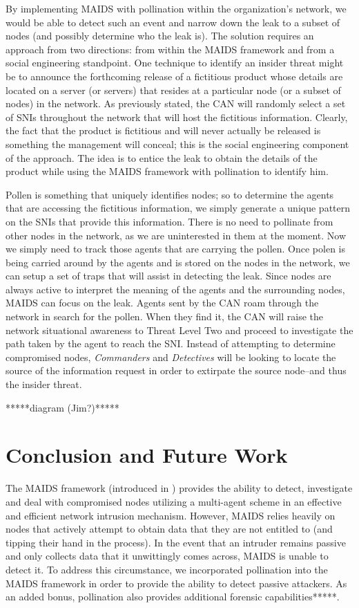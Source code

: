 \documentclass{acm_proc_article-sp}
\begin{document}
By implementing MAIDS with pollination within the organization's network, we would be able to detect such an event and narrow down the leak to a subset of nodes (and possibly determine who the leak is).  The solution requires an approach from two directions: from within the MAIDS framework and from a social engineering standpoint.  One technique to identify an insider threat might be to announce the forthcoming release of a fictitious product whose details are located on a server (or servers) that resides at a particular node (or a subset of nodes) in the network.  As previously stated, the CAN will randomly select a set of SNIs throughout the network that will host the fictitious information.  Clearly, the fact that the product is fictitious and will never actually be released is something the management will conceal; this is the social engineering component of the approach.  The idea is to entice the leak to obtain the details of the product while using the MAIDS framework with pollination to identify him.

Pollen is something that uniquely identifies nodes; so to determine the agents that are accessing the fictitious information, we simply generate a unique pattern on the SNIs that provide this information.  There is no need to pollinate from other nodes in the network, as we are uninterested in them at the moment.  Now we simply need to track those agents that are carrying the pollen.  Once polen is being carried around by the agents and is stored on the nodes in the network, we can setup a set of traps that will assist in detecting the leak.  Since nodes are always active to interpret the meaning of the agents and the surrounding nodes, MAIDS can focus on the leak.  Agents sent by the CAN roam through the network in search for the pollen.  When they find it, the CAN will raise the network situational awareness to Threat Level Two and proceed to investigate the path taken by the agent to reach the SNI.  Instead of attempting to determine compromised nodes, {\it Commanders} and {\it Detectives} will be looking to locate the source of the information request in order to extirpate the source node--and thus the insider threat.

*****diagram (Jim?)*****

\section{Conclusion and Future Work}
The MAIDS framework (introduced in \cite{kackley09}) provides the ability to detect, investigate and deal with compromised nodes utilizing a multi-agent scheme in an effective and efficient network intrusion mechanism.  However, MAIDS relies heavily on nodes that actively attempt to obtain data that they are not entitled to (and tipping their hand in the process).  In the event that an intruder remains passive and only collects data that it unwittingly comes across, MAIDS is unable to detect it.  To address this circumstance, we incorporated pollination into the MAIDS framework in order to provide the ability to detect passive attackers.  As an added bonus, pollination also provides additional forensic capabilities*****.
\end{document}
